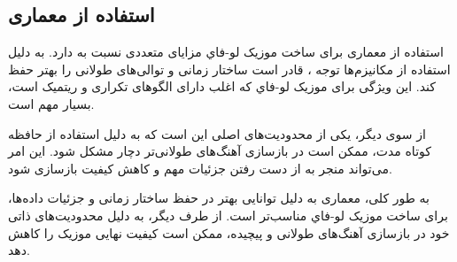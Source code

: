 \subsection{استفاده از معماری }

استفاده از معماری  برای ساخت موزیک ﻟﻮ-ﻓﺎﻱ مزایای متعددی نسبت به   دارد.  به دلیل استفاده از مکانیزم‌ها توجه ، قادر است ساختار زمانی و توالی‌های طولانی را بهتر حفظ کند. این ویژگی برای موزیک ﻟﻮ-ﻓﺎﻱ که اغلب دارای الگوهای تکراری و ریتمیک است، بسیار مهم است.

از سوی دیگر، یکی از محدودیت‌های اصلی  این است که به دلیل استفاده از حافظه کوتاه مدت، ممکن است در بازسازی آهنگ‌های طولانی‌تر دچار مشکل شود. این امر می‌تواند منجر به از دست رفتن جزئیات مهم و کاهش کیفیت بازسازی شود. 

به طور کلی، معماری  به دلیل توانایی بهتر در حفظ ساختار زمانی و جزئیات داده‌ها، برای ساخت موزیک ﻟﻮ-ﻓﺎﻱ مناسب‌تر است. از طرف دیگر،  به دلیل محدودیت‌های ذاتی خود در بازسازی آهنگ‌های طولانی و پیچیده، ممکن است کیفیت نهایی موزیک را کاهش دهد.
